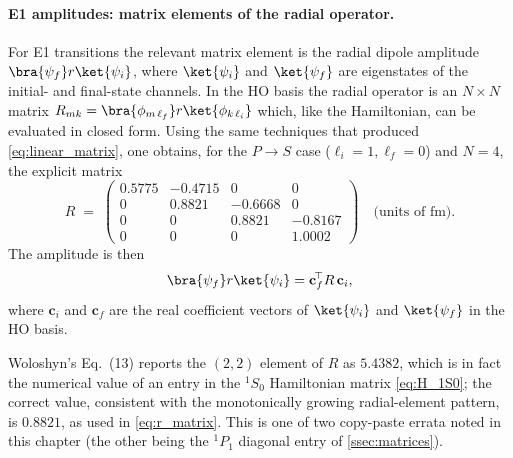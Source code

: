 \paragraph{E1 amplitudes: matrix elements of the radial operator.}
For E1 transitions the relevant matrix element is the radial dipole
amplitude $\bra{\psi_f}r\ket{\psi_i}$, where $\ket{\psi_i}$ and
$\ket{\psi_f}$ are eigenstates of the initial- and final-state
channels. In the HO basis the radial operator is an $N\times N$ matrix
$R_{mk} = \bra{\phi_{m\,\ell_f}} r \ket{\phi_{k\,\ell_i}}$ which, like
the Hamiltonian, can be evaluated in closed form. Using the same
techniques that produced \cref{eq:linear_matrix}, one obtains, for the
$P\to S$ case ($\ell_i = 1, \ell_f = 0$) and $N = 4$, the explicit
matrix~\cite{woloshyn2023}
\begin{equation}
  \label{eq:r_matrix}
  R \;=\;
  \begin{pmatrix}
    0.5775 & -0.4715 & 0      & 0      \\
    0      &  0.8821 & -0.6668 & 0     \\
    0      &  0      &  0.8821 & -0.8167\\
    0      &  0      &  0      &  1.0002
  \end{pmatrix}
  \quad \text{(units of fm)}.
\end{equation}
The amplitude is then
\begin{equation}
  \label{eq:e1_amplitude}
  \bra{\psi_f}r\ket{\psi_i} = \mathbf{c}_f^{\!\top} R\,\mathbf{c}_i,
\end{equation}
where $\mathbf{c}_i$ and $\mathbf{c}_f$ are the real coefficient vectors
of $\ket{\psi_i}$ and $\ket{\psi_f}$ in the HO basis.

\begin{remark}[Errata]
Woloshyn's Eq.~(13) reports the $(2,2)$ element of $R$ as $5.4382$, which
is in fact the numerical value of an entry in the ${}^1S_0$ Hamiltonian
matrix \cref{eq:H_1S0}; the correct value, consistent with the
monotonically growing radial-element pattern, is $0.8821$, as used in
\cref{eq:r_matrix}. This is one of two copy-paste errata noted in this
chapter (the other being the ${}^1P_1$ diagonal entry of
\cref{ssec:matrices}).
\end{remark}

